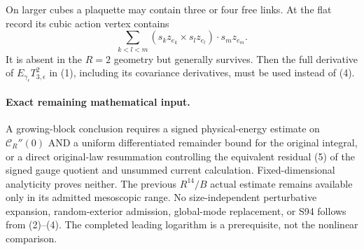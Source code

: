 \documentclass[11pt]{article}
\begin{document}
On larger cubes a plaquette may contain three or four free links.
At the flat record its cubic action vertex contains
\[
 \sum_{k<l<m}(s_kz_{e_k}\times s_lz_{e_l})\cdot s_mz_{e_m}.
\]
It is absent in the $R=2$ geometry but generally survives. Then the
full derivative of $E_{\gamma_\epsilon}T_{3,\epsilon}^2$ in (1),
including its covariance derivatives, must be used instead of (4).

\paragraph{Exact remaining mathematical input.}
A growing-block conclusion requires a signed physical-energy estimate on
$\mathcal C_R''(0)$ AND a uniform differentiated remainder bound for the
original integral, or a direct original-law resummation controlling the
equivalent residual (5) of the signed gauge quotient and unsummed current calculation. Fixed-dimensional analyticity proves neither.
The previous $R^{14}/B$ actual estimate remains available only in its
admitted mesoscopic range. No size-independent perturbative expansion,
random-exterior admission, global-mode replacement, or S94 follows from
(2)--(4). The completed leading logarithm is a prerequisite, not the
nonlinear comparison.
\end{document}
